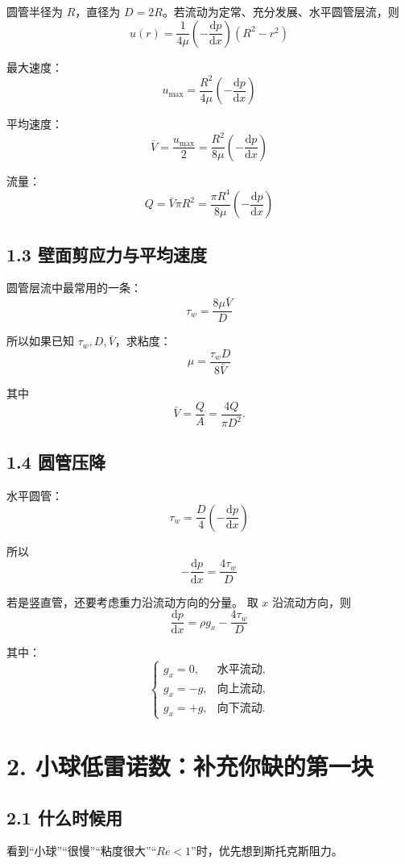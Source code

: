 ﻿\documentclass[12pt,a4paper]{ctexart}
\newcommand{\dd}{\mathrm d}
\begin{document}
圆管半径为 \(R\)，直径为 \(D=2R\)。若流动为定常、充分发展、水平圆管层流，则
\[
\boxed{
u(r)=\frac{1}{4\mu}\left(-\frac{\dd p}{\dd x}\right)(R^2-r^2)
}
\]

最大速度：
\[
\boxed{
u_{\max}=\frac{R^2}{4\mu}\left(-\frac{\dd p}{\dd x}\right)
}
\]

平均速度：
\[
\boxed{
\bar V=\frac{u_{\max}}{2}
=\frac{R^2}{8\mu}\left(-\frac{\dd p}{\dd x}\right)
}
\]

流量：
\[
\boxed{
Q=\bar V\pi R^2
=\frac{\pi R^4}{8\mu}\left(-\frac{\dd p}{\dd x}\right)
}
\]

\subsection*{1.3 壁面剪应力与平均速度}

圆管层流中最常用的一条：
\[
\boxed{
\tau_w=\frac{8\mu \bar V}{D}
}
\]

所以如果已知 \(\tau_w,D,\bar V\)，求粘度：
\[
\boxed{
\mu=\frac{\tau_wD}{8\bar V}
}
\]

其中
\[
\bar V=\frac{Q}{A}=\frac{4Q}{\pi D^2}.
\]

\subsection*{1.4 圆管压降}

水平圆管：
\[
\boxed{
\tau_w=\frac{D}{4}\left(-\frac{\dd p}{\dd x}\right)
}
\]

所以
\[
\boxed{
-\frac{\dd p}{\dd x}=\frac{4\tau_w}{D}
}
\]

若是竖直管，还要考虑重力沿流动方向的分量。
取 \(x\) 沿流动方向，则
\[
\boxed{
\frac{\dd p}{\dd x}
=\rho g_x-\frac{4\tau_w}{D}
}
\]

其中：
\[
\begin{cases}
g_x=0, & \text{水平流动},\\
g_x=-g, & \text{向上流动},\\
g_x=+g, & \text{向下流动}.
\end{cases}
\]

\section*{2. 小球低雷诺数：补充你缺的第一块}

\subsection*{2.1 什么时候用}

看到“小球”“很慢”“粘度很大”“\(Re<1\)”时，优先想到斯托克斯阻力。
\end{document}
